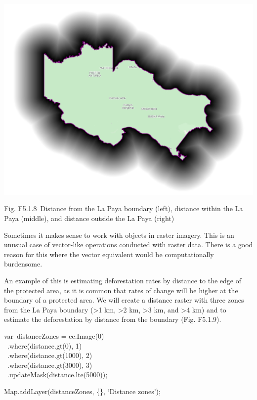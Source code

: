 \documentclass[
  letterpaper,
  DIV=11,
  numbers=noendperiod]{scrreprt}
\begin{document}
\includegraphics{./F5/image25.png}

Fig. F5.1.8~Distance from the La Paya boundary (left), distance within
the La Paya (middle), and distance outside the La Paya (right)

Sometimes it makes sense to work with objects in raster imagery. This is
an unusual case of vector-like operations conducted with raster data.
There is a good reason for this where the vector equivalent would be
computationally burdensome.

An example of this is estimating deforestation rates by distance to the
edge of the protected area, as it is common that rates of change will be
higher at the boundary of a protected area. We will create a distance
raster with three zones from the La Paya boundary (\textgreater1 km,
\textgreater2 km, \textgreater3 km, and \textgreater4 km) and to
estimate the deforestation by distance from the boundary (Fig. F5.1.9).

var~distanceZones = ee.Image(0)\\
\hspace*{0.333em} ~.where(distance.gt(0), 1)\\
\hspace*{0.333em} ~.where(distance.gt(1000), 2)\\
\hspace*{0.333em} ~.where(distance.gt(3000), 3)\\
\hspace*{0.333em} ~.updateMask(distance.lte(5000));

Map.addLayer(distanceZones, \{\}, `Distance zones');
\end{document}
